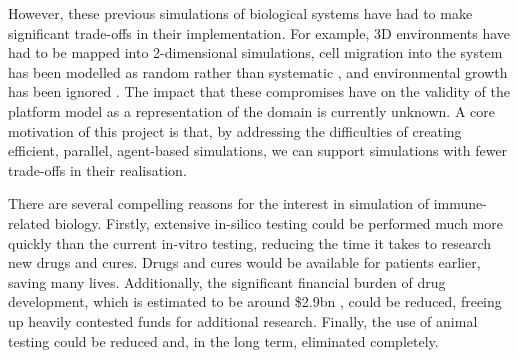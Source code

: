 \documentclass{UoYCSproject}
\begin{document}
However, these previous simulations of biological systems have had to make significant trade-offs in their implementation.
For example, 3D environments have had to be mapped into 2-dimensional simulations, cell migration into the system has been modelled as random rather than systematic \cite{kieran_thesis}, and environmental growth has been ignored \cite{phil_diss}.
The impact that these compromises have on the validity of the platform model as a representation of the domain is currently unknown.
A core motivation of this project is that, by addressing the difficulties of creating efficient, parallel, agent-based simulations, we can support simulations with fewer trade-offs in their realisation.

There are several compelling reasons for the interest in simulation of immune-related biology.
Firstly, extensive \gls{in-silico} testing could be performed much more quickly than the current \gls{in-vitro} testing, reducing the time it takes to research new drugs and cures.
Drugs and cures would be available for patients earlier, saving many lives.
Additionally, the significant financial burden of drug development, which is estimated to be around \$2.9bn \cite{drug_cost}, could be reduced, freeing up heavily contested funds for additional research. Finally, the use of animal testing could be reduced and, in the long term, eliminated completely.
\end{document}
